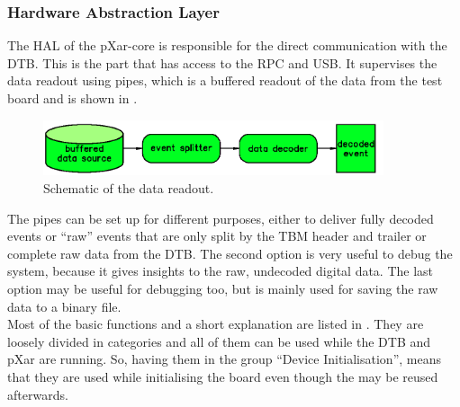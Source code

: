 \documentclass[british,11pt,a4paper]{memoir}
\begin{document}
\subsubsection{Hardware Abstraction Layer}
The \ac{HAL} of the pXar-core is responsible for the direct communication with the \ac{DTB}. This is the part that has access to the \ac{RPC} and USB. It supervises the data readout using pipes, which is a buffered readout of the data from the test board and is shown in .
\begin{figure}[ht]
	\vspace*{-5pt}
	\centering
	\includegraphics[width=10cm]{hal_buf}
	\caption{Schematic of the data readout.}
	\label{preadout}
	\vspace*{-5pt}
\end{figure}\no
The pipes can be set up for different purposes, either to deliver fully decoded events or ``raw'' events that are only split by the \ac{TBM} header and trailer or complete raw data from the \ac{DTB}. The second option is very useful to debug the system, because it gives insights to the raw, undecoded digital data. The last option may be useful for debugging too, but is mainly used for saving the raw data to a binary file.\\
Most of the basic functions and a short explanation are listed in . They are loosely divided in categories and all of them can be used while the \ac{DTB} and pXar are running. So, having them in the group ``Device Initialisation'', means that they are used while initialising the board even though the may be reused afterwards.
\end{document}
